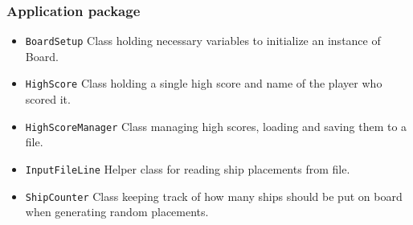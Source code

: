 \documentclass[]{article}
\begin{document}
\subsubsection{Application package}
\begin{itemize}
	\itemsep0em 
	\item \texttt{BoardSetup} Class holding necessary variables to initialize an instance of Board.
	\item \texttt{HighScore} Class holding a single high score and name of the player who scored it.
	\item \texttt{HighScoreManager} Class managing high scores, loading and saving them to a file.
	\item \texttt{InputFileLine} Helper class for reading ship placements from file.
	\item \texttt{ShipCounter} Class keeping track of how many ships should be put on board when generating random placements.
\end{itemize}
\end{document}
